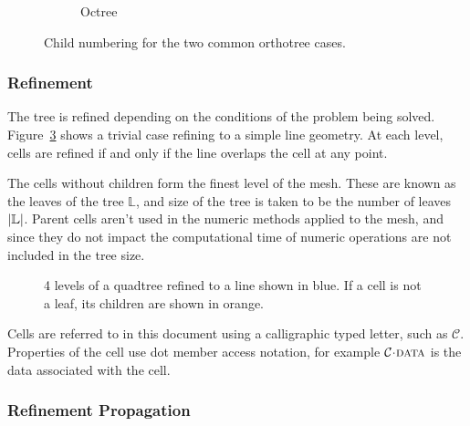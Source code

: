 \documentclass[twoside]{IIBproject}
\newcommand{\acc}{{\mkern 0.5mu\cdot\mkern 0.5mu}}
\numberwithin{figure}{section}
\begin{document}
\begin{figure} [H]
\begin{subfigure}[b]{.3\textwidth}
                    \caption{Octree}
                    \label{fig:childnum-3d}
                \end{subfigure}%
                \caption{Child numbering for the two common orthotree cases.}
                \label{fig:childnum}
            \end{figure}



        \subsubsection{Refinement} %
            \label{sec:orthotree-refine}

            The tree is refined depending on the conditions of the problem being solved. Figure~\ref{fig:layeredtree} shows a trivial case refining to a simple line geometry. At each level, cells are refined if and only if the line overlaps the cell at any point. 

            The cells without children form the finest level of the mesh. These are known as the leaves of the tree $\mathbb{L}$, and size of the tree is taken to be the number of leaves $\abs{\mathbb{L}}$. Parent cells aren't used in the numeric methods applied to the mesh, and since they do not impact the computational time of numeric operations are not included in the tree size. 

            \begin{figure} [H]
                
                \caption{4 levels of a quadtree refined to a line shown in blue. If a cell is not a leaf, its children are shown in orange.}
                \label{fig:layeredtree}
            \end{figure}

            Cells are referred to in this document using a calligraphic typed letter, such as $\mathcal{C}$. Properties of the cell use dot member access notation, for example $\mathcal{C}\acc\textproc{data}$ is the data associated with the cell. 



        \subsubsection{Refinement Propagation} %
            \label{sec:orthotree-refprop}
\end{document}
